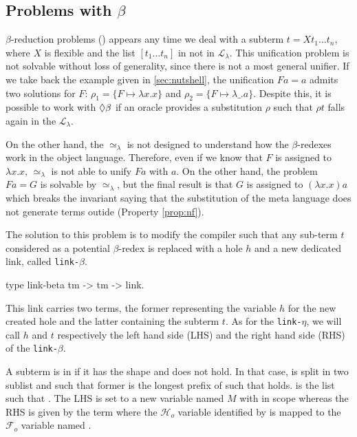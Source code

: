 \documentclass[sigconf,natbib=false,review]{acmart}
\newcommand{\UnifRel}{\ensuremath{\simeq}}
\newcommand{\Ue}{\ensuremath{\UnifRel_\lambda}\xspace}
\newcommand{\llambda}{\ensuremath{\mathcal{L}_\lambda}\xspace}
\newcommand{\linkbeta}{\texttt{link-}\ensuremath{\beta}\xspace}
\newcommand{\linketa}{\texttt{link-}\ensuremath{\eta}\xspace}
\newcommand{\Fo}{\ensuremath{\mathcal{F}_{\!o}\xspace}} %
\newcommand{\Ho}{\ensuremath{\mathcal{H}_o}\xspace}
\begin{document}
\subsection{Problems with $\beta$}



$\beta$-reduction problems (\maybebeta) appears any time we deal with a subterm $t
= X t_1 \dots t_n$, where $X$ is flexible and the list $[t_1 \dots t_n]$ in not
in \llambda. This unification problem is not solvable without loss of
generality, since there is not a most general unifier. If we take back the
example given in \cref{sec:nutshell}, the unification $F a = a$ admits two solutions for $F$:
$\rho_1 = \{F \mapsto \lambda x.x\}$ and $\rho_2 = \{F \mapsto \lambda \_.a\}$.
Despite this, it is possible to work with $\Diamond\beta$ if an oracle provides a
substitution $\rho$ such that $\rho t$ falls again in the \llambda. 

On the other hand, the \Ue is not designed to understand how the $\beta$-redexes
work in the object language. Therefore, even if we know that $F$ is assigned
to $\lambda x.x$, \Ue is not able to unify $F a$ with $a$. On the other hand,
the problem $F a = G$ is solvable by \Ue, but the final result is that $G$ is
assigned to $(\lambda x.x) a$ which breaks the invariant saying that the 
substitution of the meta language does not generate terms outide \wellb{} (Property \ref{prop:nf}).

The solution to this problem is to modify the compiler such that any sub-term $t$
considered as a potential $\beta$-redex is replaced with a hole $h$ and a new dedicated
link, called \linkbeta.

\begin{elpicode}
  type link-beta tm -> tm -> link.
\end{elpicode}
  
This link carries two terms, the former representing the variable $h$ for the
new created hole and the latter containing the subterm $t$. As for the \linketa,
we will call $h$ and $t$ respectively the left hand side (LHS)
and the right hand side (RHS) of the \linkbeta.

A subterm is in \maybebeta{} if it has the shape  and  does not hold. In that case,  is split
in two sublist  and  such that former is the longest
prefix of  such that  holds.  is the
list such that . The LHS is set to a new variable
named $M$ with  in scope whereas the RHS is given by the term
 where the \Ho variable identified by 
is mapped to the \Fo{} variable named .
\end{document}
